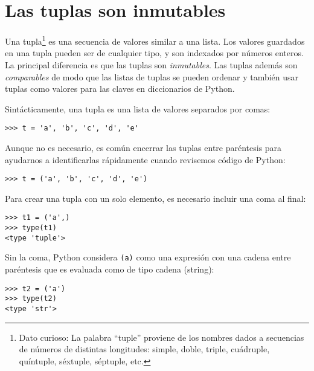 
\hypertarget{las-tuplas-son-inmutables}{%
\section{Las tuplas son inmutables}\label{las-tuplas-son-inmutables}}

  

Una tupla\footnote{Dato curioso: La palabra ``tuple'' proviene de los
  nombres dados a secuencias de números de distintas longitudes: simple,
  doble, triple, cuádruple, quíntuple, séxtuple, séptuple, etc.} es una
secuencia de valores similar a una lista. Los valores guardados en una
tupla pueden ser de cualquier tipo, y son indexados por números enteros.
La principal diferencia es que las tuplas son \emph{inmutables}. Las
tuplas además son \emph{comparables}
de modo que las listas de tuplas se pueden ordenar y también usar tuplas
como valores para las claves en diccionarios de Python.

Sintácticamente, una tupla es una lista de valores separados por comas:

\begin{Verbatim}[frame=single]
>>> t = 'a', 'b', 'c', 'd', 'e'
\end{Verbatim}

Aunque no es necesario, es común encerrar las tuplas entre paréntesis para ayudarnos a identificarlas rápidamente cuando revisemos código de Python:



\begin{Verbatim}[frame=single]
>>> t = ('a', 'b', 'c', 'd', 'e')
\end{Verbatim}


Para crear una tupla con un solo elemento, es necesario incluir una coma
al final:

 


\begin{Verbatim}[frame=single]
>>> t1 = ('a',)
>>> type(t1)
<type 'tuple'>
\end{Verbatim}


Sin la coma, Python considera
\texttt{(\textquotesingle{}a\textquotesingle{})} como una expresión con
una cadena entre paréntesis que es evaluada como de tipo cadena
(string):


\begin{Verbatim}[frame=single]
>>> t2 = ('a')
>>> type(t2)
<type 'str'>
\end{Verbatim}


